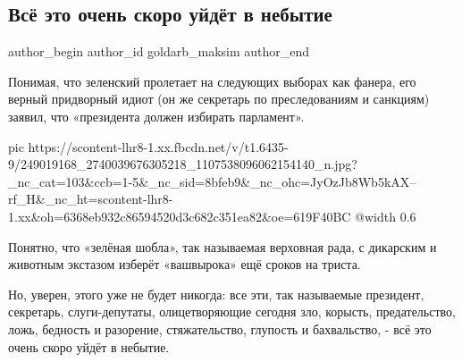  
 
 
 
 
 
\subsection{Всё это очень скоро уйдёт в небытие}
\label{sec:25_10_2021.fb.goldarb_maksim.1.prezident_parlament}
 
\ifcmt
 author_begin
   author_id goldarb_maksim
 author_end
\fi

Понимая, что зеленский пролетает на следующих выборах как фанера, его верный
придворный идиот (он же секретарь по преследованиям и санкциям) заявил, что
«президента должен избирать парламент».  

\ifcmt
  pic https://scontent-lhr8-1.xx.fbcdn.net/v/t1.6435-9/249019168_2740039676305218_1107538096062154140_n.jpg?_nc_cat=103&ccb=1-5&_nc_sid=8bfeb9&_nc_ohc=JyOzJb8Wb5kAX--rf_H&_nc_ht=scontent-lhr8-1.xx&oh=6368eb932c86594520d3c682c351ea82&oe=619F40BC
  @width 0.6
\fi

Понятно, что «зелёная шобла», так называемая верховная рада, с дикарским и
животным экстазом изберёт «вашвырока» ещё сроков на триста.  

Но, уверен, этого уже не будет никогда: все эти, так называемые президент,
секретарь, слуги-депутаты, олицетворяющие сегодня зло, корысть, предательство,
ложь, бедность и разорение, стяжательство, глупость и бахвальство, - всё это
очень скоро уйдёт в небытие.


